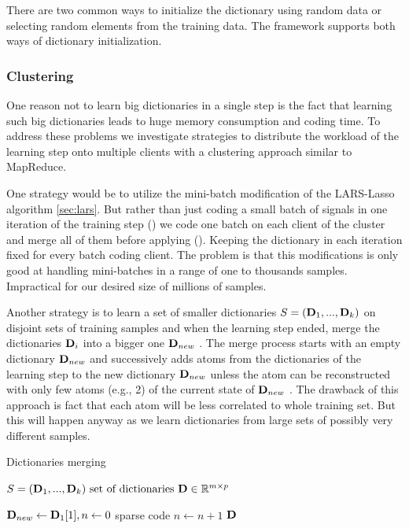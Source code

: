 There are two common ways to initialize the dictionary using random data or
selecting random elements from the training data. The framework supports 
both ways of dictionary initialization. 


\subsubsection{Clustering}
One reason not to learn big dictionaries in a single step is the fact that
learning such big dictionaries leads to huge memory consumption and coding time.
To address these problems we investigate strategies to distribute the workload
of the learning step onto multiple clients with a clustering approach similar to
MapReduce. 

One strategy would be to utilize the mini-batch
modification of the LARS-Lasso algorithm \ref{sec:lars}. But rather
than just coding a small batch of signals in one iteration of the training
step () we code one batch on each client of the cluster
and merge all of them before applying (). Keeping the
dictionary in each iteration fixed for every batch coding client. The problem is
that this modifications is only good at handling mini-batches in a range of one
to thousands samples. Impractical for our desired size of millions of samples.

Another strategy is to learn a set of smaller dictionaries $S =
(\boldsymbol{\mathrm{D}}_1, ..., \boldsymbol{\mathrm{D}}_k)$ on disjoint sets of training samples and when
the learning step ended, merge the dictionaries $\boldsymbol{\mathrm{D}}_i$ into a bigger one
$\boldsymbol{\mathrm{D}}_{new}$ . The merge process starts with an empty dictionary
$\boldsymbol{\mathrm{D}}_{new}$  and successively adds atoms from the dictionaries of the
learning step to the new dictionary $\boldsymbol{\mathrm{D}}_{new}$  unless the atom can be
reconstructed with only few atoms (e.g., 2) of the current state of
$\boldsymbol{\mathrm{D}}_{new}$ . The drawback of this approach is fact that 
each atom will be less correlated to whole training set. But this will happen
anyway as we learn dictionaries from large sets of possibly very different
samples. 

\begin{algorithm}[H]
\caption{Dictionaries merging}
\label{alg:merging}
\begin{algorithmic}[1]
\REQUIRE $ S = (\boldsymbol{\mathrm{D}}_1, ..., \boldsymbol{\mathrm{D}}_k) \text{ set of dictionaries } \boldsymbol{\mathrm{D}}
\in \mathbb{R}^{m\times p}$

\STATE $\boldsymbol{\mathrm{D}}_{new} \gets \boldsymbol{\mathrm{D}}_{1}[1], n \gets 0$
\STATE sparse code 
\STATE $n \gets n+1$
\ENDFOR
\ENDFOR
\RETURN $\boldsymbol{\mathrm{D}}$
\end{algorithmic}
\end{algorithm}



